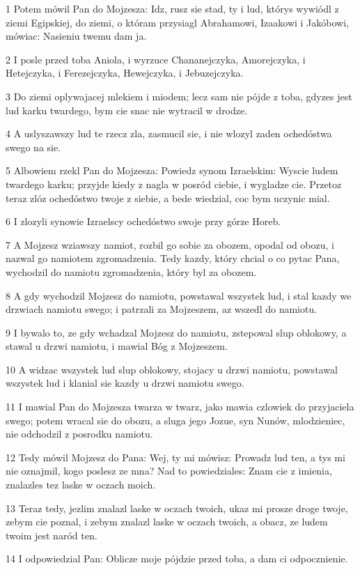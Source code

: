 \par 1 Potem mówil Pan do Mojzesza: Idz, rusz sie stad, ty i lud, którys wywiódl z ziemi Egipskiej, do ziemi, o któram przysiagl Abrahamowi, Izaakowi i Jakóbowi, mówiac: Nasieniu twemu dam ja.
\par 2 I posle przed toba Aniola, i wyrzuce Chananejczyka, Amorejczyka, i Hetejczyka, i Ferezejczyka, Hewejczyka, i Jebuzejczyka.
\par 3 Do ziemi oplywajacej mlekiem i miodem; lecz sam nie pójde z toba, gdyzes jest lud karku twardego, bym cie snac nie wytracil w drodze.
\par 4 A uslyszawszy lud te rzecz zla, zasmucil sie, i nie wlozyl zaden ochedóstwa swego na sie.
\par 5 Albowiem rzekl Pan do Mojzesza: Powiedz synom Izraelskim: Wyscie ludem twardego karku; przyjde kiedy z nagla w posród ciebie, i wygladze cie. Przetoz teraz zlóz ochedóstwo twoje z siebie, a bede wiedzial, coc bym uczynic mial.
\par 6 I zlozyli synowie Izraelscy ochedóstwo swoje przy górze Horeb.
\par 7 A Mojzesz wziawszy namiot, rozbil go sobie za obozem, opodal od obozu, i nazwal go namiotem zgromadzenia. Tedy kazdy, który chcial o co pytac Pana, wychodzil do namiotu zgromadzenia, który byl za obozem.
\par 8 A gdy wychodzil Mojzesz do namiotu, powstawal wszystek lud, i stal kazdy we drzwiach namiotu swego; i patrzali za Mojzeszem, az wszedl do namiotu.
\par 9 I bywalo to, ze gdy wchadzal Mojzesz do namiotu, zstepowal slup oblokowy, a stawal u drzwi namiotu, i mawial Bóg z Mojzeszem.
\par 10 A widzac wszystek lud slup oblokowy, stojacy u drzwi namiotu, powstawal wszystek lud i klanial sie kazdy u drzwi namiotu swego.
\par 11 I mawial Pan do Mojzesza twarza w twarz, jako mawia czlowiek do przyjaciela swego; potem wracal sie do obozu, a sluga jego Jozue, syn Nunów, mlodzieniec, nie odchodzil z posrodku namiotu.
\par 12 Tedy mówil Mojzesz do Pana: Wej, ty mi mówisz: Prowadz lud ten, a tys mi nie oznajmil, kogo poslesz ze mna? Nad to powiedziales: Znam cie z imienia, znalazles tez laske w oczach moich.
\par 13 Teraz tedy, jezlim znalazl laske w oczach twoich, ukaz mi prosze droge twoje, zebym cie poznal, i zebym znalazl laske w oczach twoich, a obacz, ze ludem twoim jest naród ten.
\par 14 I odpowiedzial Pan: Oblicze moje pójdzie przed toba, a dam ci odpocznienie.
